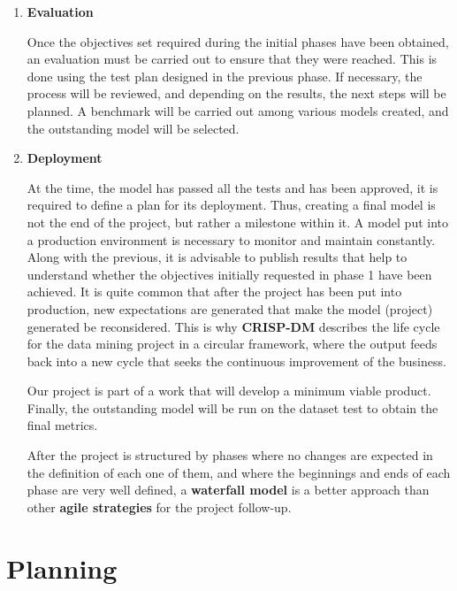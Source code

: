 \begin{enumerate}
    
    \item \textbf{Evaluation}

    Once the objectives set required during the initial phases have been obtained, an evaluation must be carried out to ensure that they were reached. This is done using the test plan designed in the previous phase. If necessary, the process will be reviewed, and depending on the results, the next steps will be planned. A benchmark will be carried out among various models created, and the outstanding model will be selected. 

    
    \item \textbf{Deployment}

    At the time, the model has passed all the tests and has been approved, it is required to define a plan for its deployment. Thus, creating a final model is not the end of the project, but rather a milestone within it. A model put into a production environment is necessary to monitor and maintain constantly. Along with the previous, it is advisable to publish results that help to understand whether the objectives initially requested in phase 1 have been achieved. It is quite common that after the project has been put into production, new expectations are generated that make the model (project) generated be reconsidered. This is why \textbf{CRISP-DM} describes the life cycle for the data mining project in a circular framework, where the output feeds back into a new cycle that seeks the continuous improvement of the business.

    Our project is part of a work that will develop a minimum viable product. Finally, the outstanding model will be run on the dataset test to obtain the final metrics.

After the project is structured by phases where no changes are expected in the definition of each one of them, and where the beginnings and ends of each phase are very well defined, a \textbf{waterfall model} is a better approach than other \textbf{agile strategies} for the project follow-up.

    
\end{enumerate}


\section{Planning}

